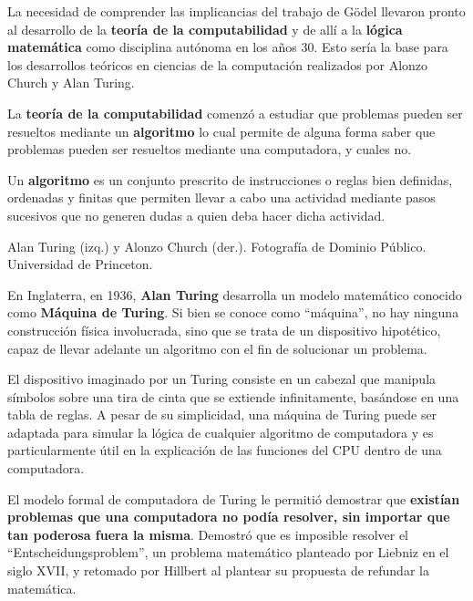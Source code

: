 La necesidad de comprender las implicancias del trabajo de Gödel llevaron pronto
al desarrollo de la \textbf{teoría de la computabilidad} y de allí a la
\textbf{lógica matemática} como disciplina autónoma en los años 30. Esto sería
la base para los desarrollos teóricos en ciencias de la computación realizados
por Alonzo Church y Alan Turing.

La \textbf{teoría de la computabilidad} comenzó a estudiar que problemas pueden
ser resueltos mediante un \textbf{algoritmo} lo cual permite de alguna forma
saber que problemas pueden ser resueltos mediante una computadora, y cuales no.

\begin{definition} Un \textbf{algoritmo} es un conjunto
    prescrito de instrucciones o reglas bien definidas, ordenadas y finitas que
    permiten llevar a cabo una actividad mediante pasos sucesivos que no generen
    dudas a quien deba hacer dicha actividad.
\end{definition}

{Alan Turing (izq.) y Alonzo Church (der.).} {Fotografía de Dominio Público.
Universidad de Princeton.}

 En Inglaterra, en 1936, \textbf{Alan Turing}
desarrolla un modelo matemático conocido como \textbf{Máquina de Turing}. Si
bien se conoce como ``máquina'', no hay ninguna construcción física involucrada,
sino que se trata de un dispositivo hipotético, capaz de llevar adelante un
algoritmo con el fin de solucionar un problema.

El dispositivo imaginado por un Turing consiste en un cabezal que manipula
símbolos sobre una tira de cinta que se extiende infinitamente, basándose en una
tabla de reglas. A pesar de su simplicidad, una máquina de Turing puede ser
adaptada para simular la lógica de cualquier algoritmo de computadora y es
particularmente útil en la explicación de las funciones del CPU dentro de una
computadora.

El modelo formal de computadora de Turing le permitió demostrar que
\textbf{existían problemas que una computadora no podía resolver, sin importar
que tan poderosa fuera la misma}. Demostró que es imposible resolver el
``Entscheidungsproblem'', un problema matemático planteado por Liebniz en el
siglo XVII, y retomado por Hillbert al plantear su propuesta de refundar la
matemática.\autocite[cap. 12]{petzold_2008}

